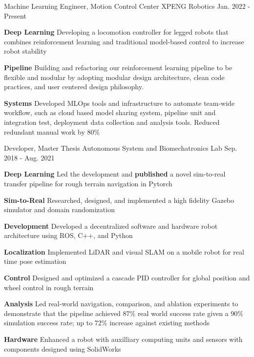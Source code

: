 \begin{cventries}
	\cventry
	{Machine Learning Engineer, Motion Control Center}
	{XPENG Robotics}
	{Jan. 2022 - Present}
	{}
	{
		\begin{cvitems}
			\item {
				\textbf{Deep Learning} Developing a locomotion controller for legged robots that combines reinforcement learning and traditional model-based control to increase robot stability
			}
			\item {
				\textbf{Pipeline} Building and refactoring our reinforcement learning pipeline to be flexible and modular by adopting modular design architecture, clean code practices, and user centered design philosophy.
			}
			\item {
				\textbf{Systems} Developed MLOps tools and infrastructure to automate team-wide workflow, such as cloud based model sharing system, pipeline unit and integration test, deployment data collection and analysis tools. Reduced redundant manual work by 80\%
			}
		\end{cvitems}
	}
	\cventry
	{Developer, Master Thesis}
	{Autonomous System and Biomechatronics Lab}
	{Sep. 2018 - Aug. 2021}
	{}
	{
		\begin{cvitems}
			\item {
				\textbf{Deep Learning} Led the development and \textbf{published} a novel sim-to-real transfer pipeline for rough terrain navigation in Pytorch
			}
			\item {
				\textbf{Sim-to-Real} Researched, designed, and implemented a high fidelity Gazebo simulator and domain randomization
			}
			\item {
				\textbf{Development} Developed a decentralized software and hardware robot architecture using ROS, C++, and Python
			}
			\item {
				\textbf{Localization} Implemented LiDAR and visual SLAM on a mobile robot for real time pose estimation
			}
			\item {
				\textbf{Control} Designed and optimized a cascade PID controller for global position and wheel control in rough terrain
			}
			\item {
				\textbf{Analysis} Led real-world navigation, comparison, and ablation experiments to demonstrate that the pipeline achieved 87\% real world success rate given a 90\% simulation success rate; up to 72\% increase against existing methods
			}
			\item {
				\textbf{Hardware} Enhanced a robot with auxilliary computing units and sensors with components designed using SolidWorks
}
\end{cvitems}}
\end{cventries}
